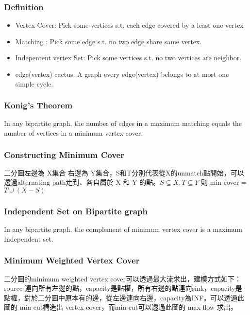 \subsubsection{Definition}
\begin{itemize}
	\setlength\itemsep{-0.5em}
	\item Vertex Cover: Pick some vertices s.t. each edge covered by a least one vertex
	\item Matching : Pick some edge s.t. no two edge share same vertex.
	\item Indepentent vertex Set: Pick some vertices s.t. no two vertices are neighbor.
	\item edge(vertex) cactus: A graph every edge(vertex) belongs to at most one simple cycle.
\end{itemize}


\subsubsection{Konig's Theorem}

In any bipartite graph, the number of edges in a maximum matching equals the number of vertices in a minimum vertex cover.

\subsubsection{Constructing Minimum Cover}

二分圖左邊為 X集合 右邊為 Y集合，S和T分別代表從X的unmatch點開始，可以透過alternating path走到、各自屬於 X 和 Y 的點。$S\subseteq X, T\subseteq Y$
則 min cover  = $T \cup \left(X-S\right)$

\subsubsection{Independent Set on Bipartite graph}

In any bipartite graph, the complement of minimum vertex cover is a maximum Independent set.

\subsubsection{Minimum Weighted Vertex Cover}

二分圖的minimum weighted vertex cover可以透過最大流求出，建模方式如下：source 連向所有左邊的點，capacity是點權，所有右邊的點連向sink，capacity是點權，對於二分圖中原本有的邊，從左邊連向右邊，capacity為INF。可以透過此圖的 min cut構造出 vertex cover，而min cut可以透過此圖的 max flow 求出。

